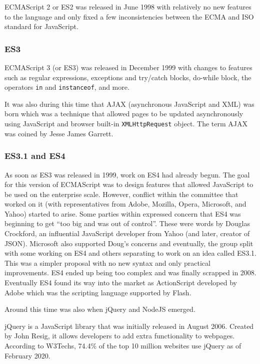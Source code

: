 \documentclass{article}
\newcommand{\jsin}[1]{\texttt{#1}}
\begin{document}
    ECMAScript 2 or ES2 was released in June 1998 with relatively no new
    features to the language and only fixed a few inconsistencies between the
    ECMA and ISO standard for JavaScript.

    \subsubsection{ES3}
    ECMAScript 3 (or ES3) was released in December 1999 with changes to features
    such as regular expressions, exceptions and try/catch blocks, do-while
    block, the operators \jsin{in} and \jsin{instanceof}, and more.

    It was also during this time that AJAX (asynchronous JavaScript and XML) was
    born which was a technique that allowed pages to be updated asynchronously
    using JavaScript and browser built-in \jsin{XMLHttpRequest} object. The term
    AJAX was coined by Jesse James Garrett.

    \subsubsection{ES3.1 and ES4}
    As soon as ES3 was released in 1999, work on ES4 had already begun. The goal
    for this version of ECMAScript was to design features that allowed
    JavaScript to be used on the enterprise scale. However, conflict within the
    committee that worked on it (with representatives from Adobe, Mozilla,
    Opera, Microsoft, and Yahoo) started to arise. Some parties within expressed
    concern that ES4 was beginning to get “too big and was out of control”.
    These were words by Douglas Crockford, an influential JavaScript developer
    from Yahoo (and later, creator of JSON). Microsoft also supported Doug’s
    concerns and eventually, the group split with some working on ES4 and others
    separating to work on an idea called ES3.1. This was a simpler proposal with
    no new syntax and only practical improvements. ES4 ended up being too
    complex and was finally scrapped in 2008. Eventually ES4 found its way into
    the market as ActionScript developed by Adobe which was the scripting
    language supported by Flash.

    Around this time was also when jQuery and NodeJS emerged.
    
    jQuery is a JavaScript library that was initially released in August 2006.
    Created by John Resig, it allows developers to add extra functionality to
    webpages. According to W3Techs, 74.4\% of the top 10 million websites use
    jQuery as of February 2020.
\end{document}
